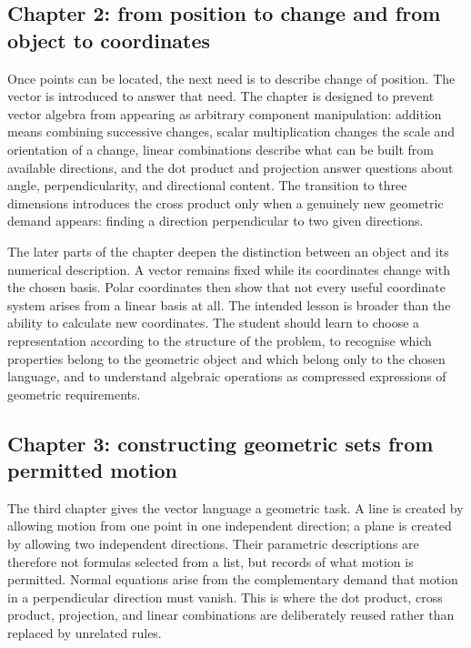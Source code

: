 \subsection*{Chapter 2: from position to change and from object to coordinates}

Once points can be located, the next need is to describe change of position. The
vector is introduced to answer that need. The chapter is designed to prevent
vector algebra from appearing as arbitrary component manipulation: addition means
combining successive changes, scalar multiplication changes the scale and
orientation of a change, linear combinations describe what can be built from
available directions, and the dot product and projection answer questions about
angle, perpendicularity, and directional content. The transition to three
dimensions introduces the cross product only when a genuinely new geometric demand
appears: finding a direction perpendicular to two given directions.

The later parts of the chapter deepen the distinction between an object and its
numerical description. A vector remains fixed while its coordinates change with
the chosen basis. Polar coordinates then show that not every useful coordinate
system arises from a linear basis at all. The intended lesson is broader than the
ability to calculate new coordinates. The student should learn to choose a
representation according to the structure of the problem, to recognise which
properties belong to the geometric object and which belong only to the chosen
language, and to understand algebraic operations as compressed expressions of
geometric requirements.

\subsection*{Chapter 3: constructing geometric sets from permitted motion}

The third chapter gives the vector language a geometric task. A line is created by
allowing motion from one point in one independent direction; a plane is created by
allowing two independent directions. Their parametric descriptions are therefore
not formulas selected from a list, but records of what motion is permitted. Normal
equations arise from the complementary demand that motion in a perpendicular
direction must vanish. This is where the dot product, cross product, projection,
and linear combinations are deliberately reused rather than replaced by unrelated
rules.

